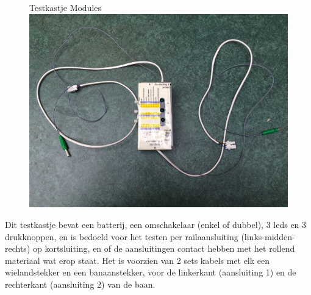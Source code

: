 \documentclass[12pt,a4paper]{report}
\begin{document}
\begin{figure}[ht]
  \captionbox
  {Testkastje Modules\label{im:testkastje}}
  {\includegraphics[scale=1.0]{images/rcu_foto2}\\}
\end{figure}

Dit testkastje bevat een batterij, een omschakelaar (enkel of dubbel), 3 leds en 3 drukknoppen, en is bedoeld voor het testen per railaansluiting (links-midden-rechts) op kortsluiting, en of de aansluitingen contact hebben met het rollend materiaal wat erop staat. 
Het is voorzien van 2 sets kabels met elk een wielandstekker en een banaanstekker, voor de linkerkant (aansluiting 1) en de rechterkant (aansluiting 2) van de baan.
\end{document}
